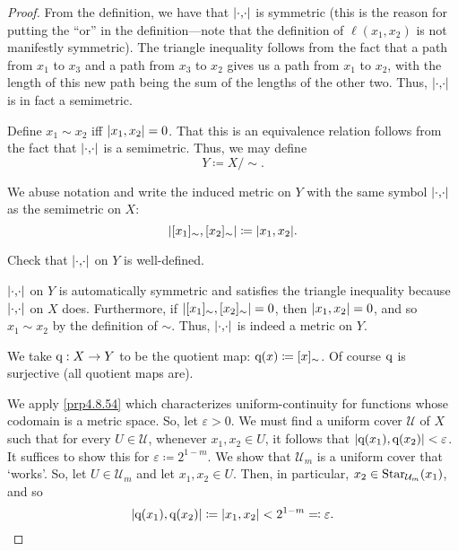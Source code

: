 \begin{thm}
\begin{savenotes}
\begin{proof}
From the definition, we have that $\metric$ is symmetric (this is the reason for putting the ``or'' in the definition---note that the definition of $\ell (x_1,x_2)$ is not manifestly symmetric).  The triangle inequality follows from the fact that a path from $x_1$ to $x_3$ and a path from $x_3$ to $x_2$ gives us a path from $x_1$ to $x_2$, with the length of this new path being the sum of the lengths of the other two.  Thus, $\metric$ is in fact a semimetric.

Define $x_1\sim x_2$ iff $\metric[x_1][x_2]=0$.  That this is an equivalence relation follows from the fact that $\metric$ is a semimetric.  Thus, we may define
\begin{equation}
Y\coloneqq X/\sim .
\end{equation}

We abuse notation and write the induced metric on $Y$ with the same symbol $\metric$ as the semimetric on $X$:
\begin{equation}
\metric[[x_1]_{\sim}][[x_2]_{\sim}]\coloneqq \metric[x_1][x_2].
\end{equation}
\begin{exr}
Check that $\metric$ on $Y$ is well-defined.
\end{exr}

$\metric$ on $Y$ is automatically symmetric and satisfies the triangle inequality because $\metric$ on $X$ does.  Furthermore, if $\metric[[x_1]_{\sim}][[x_2]_{\sim}]=0$, then $\metric[x_1][x_2]=0$, and so $x_1\sim x_2$ by the definition of $\sim$.  Thus, $\metric$ is indeed a metric on $Y$.

We take $\mathrm{q} :X\rightarrow Y$ to be the quotient map:  $\mathrm{q} (x)\coloneqq [x]_{\sim}$.  Of course $\mathrm{q}$ is surjective (all quotient maps are).

We apply \cref{prp4.8.54} which characterizes uniform-continuity for functions whose codomain is a metric space.  So, let $\varepsilon >0$.  We must find a uniform cover $\mathcal{U}$ of $X$ such that for every $U\in \mathcal{U}$, whenever $x_1,x_2\in U$, it follows that $\metric[\q (x_1)][\q (x_2)]<\varepsilon$.  It suffices to show this for $\varepsilon \coloneqq 2^{1-m}$.  We show that $\mathcal{U}_m$ is a uniform cover that `works'.  So, let $U\in \mathcal{U}_m$ and let $x_1,x_2\in U$.   Then, in particular, $x_2\in \operatorname{Star} _{\mathcal{U}_m}(x_1)$, and so
\begin{equation}
\metric[\q (x_1)][\q (x_2)]\coloneqq \metric[x_1][x_2]<2^{1-m}\eqqcolon \varepsilon .
\end{equation}


\end{proof}
\end{savenotes}
\end{thm}
